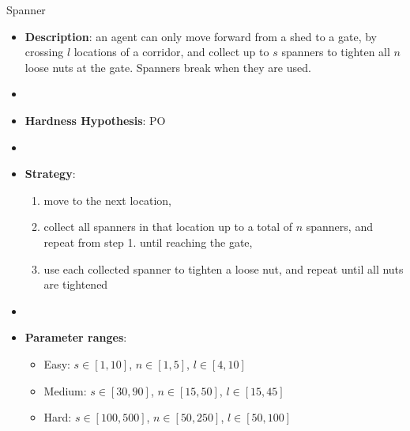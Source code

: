 \documentclass[aspectratio=169,xcolor=dvipsnames]{beamer}
\begin{document}
\begin{frame}{Spanner}
    \begin{itemize}
        \item \textbf{Description}: an agent can only move forward from a shed to a gate, by crossing $l$ locations of a corridor, and collect up to $s$ spanners to tighten all $n$ loose nuts at the gate. Spanners break when they are used.
        \item[]
        \item \textbf{Hardness Hypothesis}: PO %
        \item[]
        \item \textbf{Strategy}:
        \begin{enumerate}
            \item move to the next location,
            \item collect all spanners in that location up to a total of $n$ spanners, and repeat from step 1. until reaching the gate,
            \item use each collected spanner to tighten a loose nut, and repeat until all nuts are tightened
        \end{enumerate}
        \item[]
        \item \textbf{Parameter ranges}:
        \begin{itemize}
            \item Easy: $s\in[1,10]$, $n\in[1, 5]$, $l\in[4, 10]$
            \item Medium: $s\in[30,90]$, $n\in[15, 50]$, $l\in[15, 45]$
            \item Hard: $s\in[100,500]$, $n\in[50, 250]$, $l\in[50, 100]$
        \end{itemize}
    \end{itemize}
\end{frame}
\end{document}
